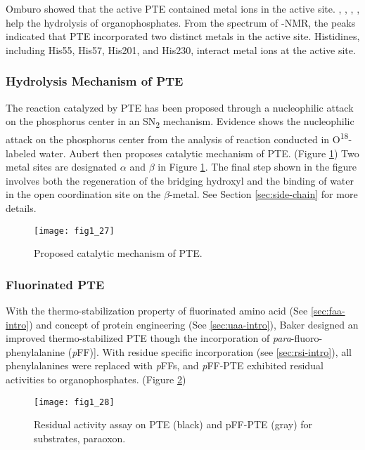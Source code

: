 \begin{refsection}
Omburo  showed that the active PTE contained metal ions in the
active site. , , , ,
 help the hydrolysis of organophosphates\cite{Omburo1992a}. From
the spectrum of -NMR, the peaks indicated that PTE incorporated
two distinct metals in the active site\cite{Omburo1993}. Histidines, including
His55, His57, His201, and His230, interact metal ions at the active
site\cite{Benning2001a}. 

\subsubsection{Hydrolysis Mechanism of PTE}

The reaction catalyzed by PTE has been proposed through a nucleophilic attack
on the phosphorus center in an SN\textsubscript{2} mechanism\cite{Lewis1988}.
Evidence shows the nucleophilic attack on the phosphorus center from the
analysis of reaction conducted in O\textsuperscript{18}-labeled
water\cite{Lewis1988}.  Aubert  then proposes catalytic mechanism
of PTE\cite{Aubert2004}.  (Figure \ref{fig:pte-mechanism}) Two metal sites are
designated $\alpha$ and $\beta$ in Figure
\ref{fig:pte-mechanism}\cite{Aubert2004}. The final step shown in the figure
involves both the regeneration of the bridging hydroxyl and the binding of
water in the open coordination site on the $\beta$-metal. See Section
\ref{sec:side-chain} for more details. 
\begin{figure}[h!] \centering \texttt{[image: fig1\_27]}
    \caption[Proposed catalytic mechanism of PTE.]{Proposed catalytic mechanism
        of PTE\cite{Aubert2004}.} \label{fig:pte-mechanism} 
\end{figure}

\subsubsection{Fluorinated PTE}

With the thermo-stabilization property of fluorinated amino acid (See
\ref{sec:faa-intro}) and concept of protein engineering (See \ref{sec:uaa-intro}),
Baker  designed an improved thermo-stabilized PTE though the
incorporation of \emph{para}-fluoro-phenylalanine
(\emph{p}FF)]\cite{Baker2011b}. With residue specific incorporation (see
\ref{sec:rsi-intro}), all phenylalanines were replaced with \emph{p}FFs, and
\emph{p}FF-PTE exhibited residual activities to organophosphates. (Figure
\ref{fig:PJB})
\begin{figure}[h!] \centering \texttt{[image: fig1\_28]}
    \caption[Residual activity assay on PTE (black) and pFF-PTE (gray) for
    substrates, paraoxon.]{Residual activity assay on PTE (black) and pFF-PTE
        (gray) for substrates, paraoxon\cite{Baker2011b}.} \label{fig:PJB}
\end{figure}


\end{refsection}
